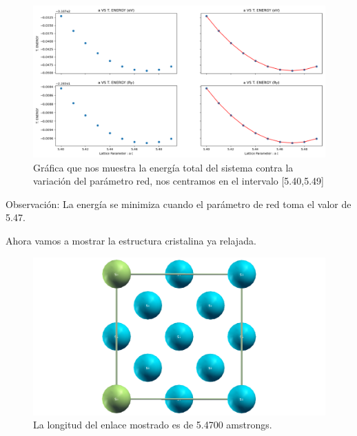 \begin{figure}[H]
    \centering
    \includegraphics[scale=0.34]{images/lattice_parameter_vs_T_energy_second.png}
    \caption{Gráfica que nos muestra la energía total del sistema contra la variación del parámetro red, nos centramos en el intervalo [5.40,5.49]}
\end{figure}

Observación: La energía se minimiza cuando el parámetro de red toma el valor de 5.47.

\vspace{0.5cm}

Ahora vamos a mostrar la estructura cristalina ya relajada.

\vspace{0.5cm}

\begin{figure}[H]
    \centering
    \includegraphics[scale=0.34]{images/longitud_enlace_5_4700_amstrongs.png}
    \caption{La longitud del enlace mostrado es de 5.4700 amstrongs.}
\end{figure}

\newpage
